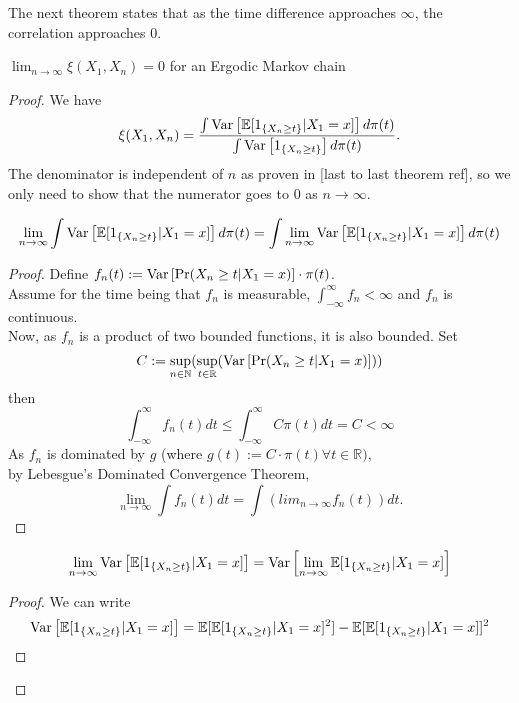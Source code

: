 \newpage
The next theorem states that as the time difference approaches $\infty$, the correlation approaches $0$.
\begin{theorem}
    $\lim_{n \rightarrow \infty} \xi(X_1, X_{n}) = 0$ for an Ergodic Markov chain
    \begin{proof}
        We have
        \begin{equation*}
            \xi(X_1, X_{n}) = \frac{\int \text{Var}\left[{{\mathbb{E}[1_{\{X_{n} \geq t\}}|X_1=x]}}\right] d\pi(t)}{\int \text{Var}\left[{{1_{\{X_{n} \geq t\}}}}\right] d\pi(t)}.
        \end{equation*}
        The denominator is independent of $n$ as proven in [last to last theorem ref], so we only need to show that the numerator goes to 0 as $n \rightarrow \infty$.\\
        \begin{lem}
            $$\lim_{n \rightarrow \infty} \int \text{Var}\left[{{\mathbb{E}[1_{\{X_{n} \geq t\}}|X_1=x]}}\right] d\pi(t) = \int \lim_{n \rightarrow \infty}\text{Var}\left[{{\mathbb{E}[1_{\{X_{n} \geq t\}}|X_1=x]}}\right] d\pi(t)$$
            \begin{proof}
                Define $f_n(t) := \text{Var}\left[{{\Pr(X_{n} \geq t | X_{1} = x)}}\right] \cdot \pi(t)$. \\
                Assume for the time being that $f_n$ is measurable, $\int_{-\infty}^{\infty} f_n < \infty$ and $f_n$ is continuous.\\
                Now, as $f_n$ is a product of two bounded functions, it is also bounded.
                Set
                $$ C:= \sup_{n \in \mathbb{N}} (\sup_{t \in \mathbb{R}} (\text{Var}\left[{{\Pr(X_{n} \geq t | X_{1} = x)}}\right]))$$
                then
                $$\int_{-\infty}^{\infty} f_n(t)dt \leq \int_{-\infty}^{\infty} C\pi(t)dt = C < \infty$$
                As $f_n$ is dominated by $g$ (where $g(t) := C\cdot\pi(t) \forall t \in \mathbb{R})$, \\
                by Lebesgue's Dominated Convergence Theorem,
                $$\lim_{n \rightarrow \infty} \int f_n(t) dt = \int (lim_{n \rightarrow \infty} f_n(t)) dt.$$
            \end{proof}
        \end{lem}
        \begin{lem}
            $$\lim_{n \rightarrow \infty} \text{Var}\left[{{\mathbb{E}[1_{\{X_{n} \geq t\}}|X_1=x]}}\right] = \text{Var}\left[{{\lim_{n \rightarrow \infty} \mathbb{E}[1_{\{X_{n} \geq t\}}|X_1=x]}}\right]$$
            \begin{proof}
                We can write
                \begin{align*}
                    \Var{\mathbb{E}[1_{\{X_{n} \geq t\}}|X_1=x]} &= \mathbb{E}[\mathbb{E}[1_{\{X_{n} \geq t\}}|X_1=x]^2] - \mathbb{E}[\mathbb{E}[1_{\{X_{n} \geq t\}}|X_1=x]]^2 \\

\end{align*}
\end{proof}
\end{lem}
\end{proof}
\end{theorem}
